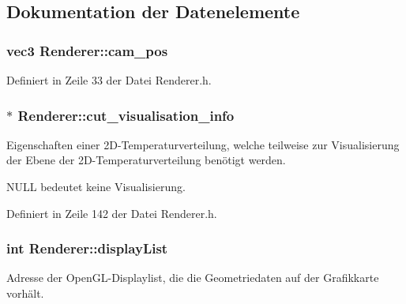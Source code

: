 \subsection{Dokumentation der Datenelemente}
\hypertarget{classRenderer_a05d0bc42ef41da14d0211c1eae4dd6d0}{
\subsubsection[{cam\-\_\-pos}]{\setlength{\rightskip}{0pt plus 5cm}vec3 Renderer\-::cam\-\_\-pos}}\label{classRenderer_a05d0bc42ef41da14d0211c1eae4dd6d0}


Definiert in Zeile 33 der Datei Renderer.\-h.

\hypertarget{classRenderer_a119b7d1e3eb740a118e269758dd1a906}{
\subsubsection[{cut\-\_\-visualisation\-\_\-info}]{$\ast$ Renderer\-::cut\-\_\-visualisation\-\_\-info\hspace{0.3cm}{\ttfamily [private]}}}\label{classRenderer_a119b7d1e3eb740a118e269758dd1a906}


Eigenschaften einer 2\-D-\/\-Temperaturverteilung, welche teilweise zur Visualisierung der Ebene der 2\-D-\/\-Temperaturverteilung benötigt werden. 

N\-U\-L\-L bedeutet keine Visualisierung. 

Definiert in Zeile 142 der Datei Renderer.\-h.

\hypertarget{classRenderer_a165ec913fa058d0a38f5e7b7635adfd2}{
\subsubsection[{display\-List}]{\setlength{\rightskip}{0pt plus 5cm}int Renderer\-::display\-List\hspace{0.3cm}{\ttfamily [private]}}}\label{classRenderer_a165ec913fa058d0a38f5e7b7635adfd2}


Adresse der Open\-G\-L-\/\-Displaylist, die die Geometriedaten auf der Grafikkarte vorhält. 



